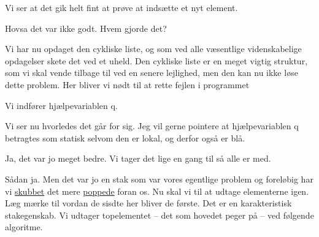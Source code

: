 \documentclass[a4paper,11pt]{article}
\begin{document}
\begin{sketch}



 Vi ser at det gik helt fint at prøve at indsætte et nyt element.



 Hovsa det var ikke godt. Hvem gjorde det?


 Vi har nu opdaget den cykliske liste, og som ved alle væsentlige
videnskabelige opdagelser skete det ved et uheld. Den cykliske liste er en meget
vigtig struktur, som vi skal vende tilbage til ved en senere lejlighed, men den
kan nu ikke løse dette problem. Her bliver vi nødt til at rette fejlen i
programmet

Vi indfører hjælpevariablen q.


 Vi ser nu hvorledes det går for sig. Jeg vil gerne pointere at
hjælpevariablen q betragtes som statisk selvom den er lokal, og derfor også er
blå.



 Ja, det var jo meget bedre. Vi tager det lige en gang til så alle er
med.


 Sådan ja. Men det var jo en stak som var vores egentlige problem og
foreløbig har vi \underline{skubbet} det mere \underline{poppede} foran os.  Nu
skal vi til at udtage elementerne igen. Læg mærke til vordan de sisdte her
bliver de første. Det er en karakteristisk stakegenskab. Vi udtager topelementet
-- det som hovedet peger på -- ved følgende algoritme.


\end{sketch}
\end{document}
